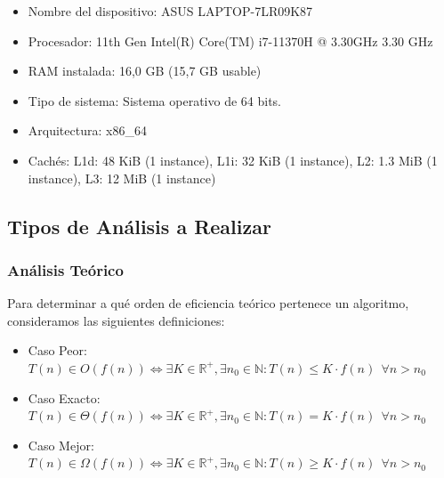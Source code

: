 \documentclass[a4paper,12pt,twoside]{article} %
\begin{document}
\begin{itemize}

	\item Nombre del dispositivo: ASUS LAPTOP-7LR09K87

	\item Procesador: 11th Gen Intel(R) Core(TM) i7-11370H @ 3.30GHz   3.30 GHz

	\item RAM instalada: 16,0 GB (15,7 GB usable)

	\item Tipo de sistema: Sistema operativo de 64 bits.

	\item Arquitectura: x86\_64

	\item Cachés: L1d: 48 KiB (1 instance), L1i: 32 KiB (1 instance), L2: 1.3 MiB (1 instance), L3: 12 MiB (1 instance)

\end{itemize}


\newpage

\subsection{Tipos de Análisis a Realizar}

\subsubsection{Análisis Teórico}

Para determinar a qué orden de eficiencia teórico pertenece un algoritmo, consideramos las siguientes definiciones:

\begin{itemize}

	\item Caso Peor:\\
	\begin{math}
	T(n) \in O(f(n)) \Leftrightarrow \exists K \in \mathbb{R^+} , \exists n_0 \in \mathbb{N} : T(n) \leq K \cdot{f(n)} \ \ \forall n > n_0
	\end{math}
	
	\item Caso Exacto:\\
	\begin{math}	
	T(n) \in \Theta(f(n)) \Leftrightarrow \exists K \in \mathbb{R^+} , \exists n_0 \in \mathbb{N} : T(n) = K \cdot{f(n)} \ \ \forall n > n_0
	\end{math}
	
	\item Caso Mejor:\\
	\begin{math}
	T(n) \in \Omega(f(n)) \Leftrightarrow \exists K \in \mathbb{R^+} , \exists n_0 \in \mathbb{N} : T(n) \geq K \cdot{f(n)} \ \ \forall n > n_0
	\end{math}
	
\end{itemize}
\end{document}
